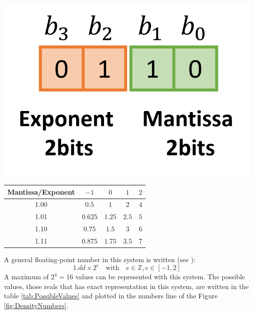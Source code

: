 \begin{minipage}{\textwidth}
    \begin{minipage}{0.3\textwidth}
        \centering
        \includegraphics[width= \textwidth]{./doc/Figures/miniminifloat.png}
        \label{fig:miniminifloat}
    \end{minipage}
    \hfill
    \begin{minipage}{0.68\textwidth}
        \centering
        \begin{tabular}{| c | c | c | c | c | }
            \hline
            Mantissa/Exponent   & $-1$ & $0$  & $1$  &   $2$  \\ \hline
            1.00                & $0.5$ & $1$  & $2$  &   $4$  \\ \hline
            1.01                & $0.625$ & $1.25$  & $2.5$  &   $5$  \\ \hline
            1.10                & $0.75$ & $1.5$  & $3$  &   $6$  \\ \hline
            1.11                & $0.875$ & $1.75$  & $3.5$  &   $7$  \\ \hline
        \end{tabular}
        \label{tab:PossibleValues}
    \end{minipage}
\end{minipage}

A general floating-point number in this system is written (see \cite{articleIEEE}): 
$$
1.dd \times 2^{e}    \quad \textrm{with}\quad e \in \mathbb{Z}, e\in\left[-1, 2\right] 
$$ 
A maximum of $2^4 = 16$ values can be represented with this system. 
The possible values, those reals that has exact representation in this system,
are written in the table \ref{tab:PossibleValues} and
plotted in the numbers line of the Figure \ref{fig:DensityNumbers}. 


